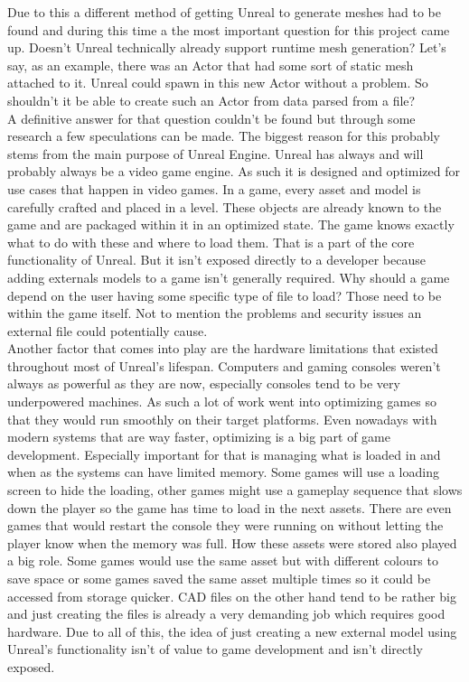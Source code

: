 Due to this a different method of getting Unreal to generate meshes had to be found and during this time a the most important question for this project came up. Doesn't Unreal technically already support runtime mesh generation? Let's say, as an example, there was an Actor that had some sort of static mesh attached to it. Unreal could spawn in this new Actor without a problem. So shouldn't it be able to create such an Actor from data parsed from a file?\\
A definitive answer for that question couldn't be found but through some research a few speculations can be made. The biggest reason for this probably stems from the main purpose of Unreal Engine. Unreal has always and will probably always be a video game engine. As such it is designed and optimized for use cases that happen in video games. In a game, every asset and model is carefully crafted and placed in a level. These objects are already known to the game and are packaged within it in an optimized state. The game knows exactly what to do with these and where to load them. That is a part of the core functionality of Unreal. But it isn't exposed directly to a developer because adding externals models to a game isn't generally required. Why should a game depend on the user having some specific type of file to load? Those need to be within the game itself. Not to mention the problems and security issues an external file could potentially cause.\\
Another factor that comes into play are the hardware limitations that existed throughout most of Unreal's lifespan. Computers and gaming consoles weren't always as powerful as they are now, especially consoles tend to be very underpowered machines. As such a lot of work went into optimizing games so that they would run smoothly on their target platforms. Even nowadays with modern systems that are way faster, optimizing is a big part of game development. Especially important for that is managing what is loaded in and when as the systems can have limited memory. Some games will use a loading screen to hide the loading, other games might use a gameplay sequence that slows down the player so the game has time to load in the next assets. There are even games that would restart the console they were running on without letting the player know when the memory was full\cite{}. How these assets were stored also played a big role. Some games would use the same asset but with different colours to save space or some games saved the same asset multiple times so it could be accessed from storage quicker\cite{}. CAD files on the other hand tend to be rather big and just creating the files is already a very demanding job which requires good hardware. Due to all of this, the idea of just creating a new external model using Unreal's functionality isn't of value to game development and isn't directly exposed.\\

